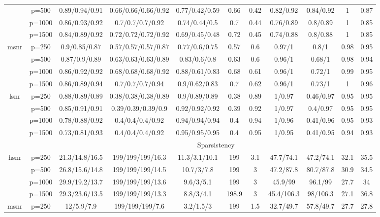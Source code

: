 \begin{table}[ht]
{\begin{tabular}{|c|c|ccccccccc|}
   & p=500 & 0.89/0.94/0.91 & 0.66/0.66/0.66/0.92 & 0.77/0.42/0.59 & 0.66 & 0.42 & 0.82/0.92 & 0.84/0.92 & 1 & 0.87 \\ 
   & p=1000 & 0.86/0.93/0.92 & 0.7/0.7/0.7/0.92 & 0.74/0.44/0.5 & 0.7 & 0.44 & 0.76/0.89 & 0.8/0.89 & 1 & 0.85 \\ 
   & p=1500 & 0.84/0.89/0.92 & 0.72/0.72/0.72/0.92 & 0.69/0.45/0.48 & 0.72 & 0.45 & 0.74/0.88 & 0.8/0.88 & 1 & 0.85 \\ 
  \midrule\multirow{4}[2]{*}{msnr} & p=250 & 0.9/0.85/0.87 & 0.57/0.57/0.57/0.87 & 0.77/0.6/0.75 & 0.57 & 0.6 & 0.97/1 & 0.8/1 & 0.98 & 0.95 \\ 
   & p=500 & 0.87/0.9/0.89 & 0.63/0.63/0.63/0.89 & 0.83/0.6/0.8 & 0.63 & 0.6 & 0.96/1 & 0.68/1 & 0.98 & 0.94 \\ 
   & p=1000 & 0.86/0.92/0.92 & 0.68/0.68/0.68/0.92 & 0.88/0.61/0.83 & 0.68 & 0.61 & 0.96/1 & 0.72/1 & 0.99 & 0.95 \\ 
   & p=1500 & 0.86/0.89/0.94 & 0.7/0.7/0.7/0.94 & 0.9/0.62/0.83 & 0.7 & 0.62 & 0.96/1 & 0.73/1 & 1 & 0.96 \\ 
  \midrule\multirow{4}[2]{*}{lsnr} & p=250 & 0.88/0.89/0.89 & 0.38/0.38/0.38/0.89 & 0.9/0.89/0.89 & 0.38 & 0.89 & 1/0.97 & 0.46/0.97 & 0.95 & 0.95 \\ 
   & p=500 & 0.85/0.91/0.91 & 0.39/0.39/0.39/0.9 & 0.92/0.92/0.92 & 0.39 & 0.92 & 1/0.97 & 0.4/0.97 & 0.95 & 0.95 \\ 
   & p=1000 & 0.78/0.88/0.92 & 0.4/0.4/0.4/0.92 & 0.94/0.94/0.94 & 0.4 & 0.94 & 1/0.96 & 0.41/0.96 & 0.95 & 0.93 \\ 
   & p=1500 & 0.73/0.81/0.93 & 0.4/0.4/0.4/0.92 & 0.95/0.95/0.95 & 0.4 & 0.95 & 1/0.95 & 0.41/0.95 & 0.94 & 0.93 \\ 
   \midrule 
 \multicolumn{1}{|c}{} &       & \multicolumn{9}{c|}{Sparsistency} \\
\midrule\multirow{4}[2]{*}{hsnr} & p=250 & 21.3/14.8/16.5 & 199/199/199/16.3 & 11.3/3.1/10.1 & 199 & 3.1 & 47.7/74.1 & 47.2/74.1 & 32.1 & 35.5 \\ 
   & p=500 & 26.8/15.6/14.8 & 199/199/199/14.5 & 10.7/3/7.8 & 199 & 3 & 47.2/87.8 & 80.7/87.8 & 30.9 & 34.5 \\ 
   & p=1000 & 29.9/19.2/13.7 & 199/199/199/13.6 & 9.6/3/5.1 & 199 & 3 & 45.9/99 & 96.1/99 & 27.7 & 34 \\ 
   & p=1500 & 29.3/23.6/13.5 & 199/199/199/13.3 & 8.8/3/4.1 & 198.9 & 3 & 45.4/106.3 & 98/106.3 & 27.1 & 36.8 \\ 
  \midrule\multirow{4}[2]{*}{msnr} & p=250 & 12/5.9/7.9 & 199/199/199/7.6 & 3.2/1.5/3 & 199 & 1.5 & 32.7/49.7 & 57.8/49.7 & 27.7 & 27.8 \\ 

\end{tabular}}
\end{table}
